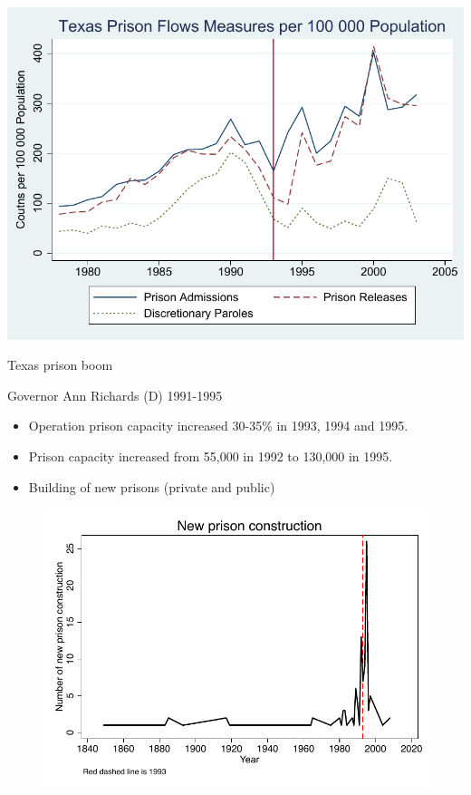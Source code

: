 \documentclass{beamer}
\begin{document}
\begin{frame}[plain]
  \includegraphics[scale=0.8]{./lecture_includes/flow_rate_figure.pdf}
\end{frame}

\begin{frame}{Texas prison boom}

Governor Ann Richards (D) 1991-1995
		\begin{itemize}
		\item Operation prison capacity increased 30-35\% in 1993, 1994 and 1995. 
		\item Prison capacity increased from 55,000 in 1992 to 130,000 in 1995.  
		\item Building of new prisons (private and public)
		\end{itemize} 
\end{frame}


\begin{frame}[shrink=30,plain]

\begin{figure}
\includegraphics{./lecture_includes/tdcj.pdf}
\end{figure}
\end{frame}
\end{document}
